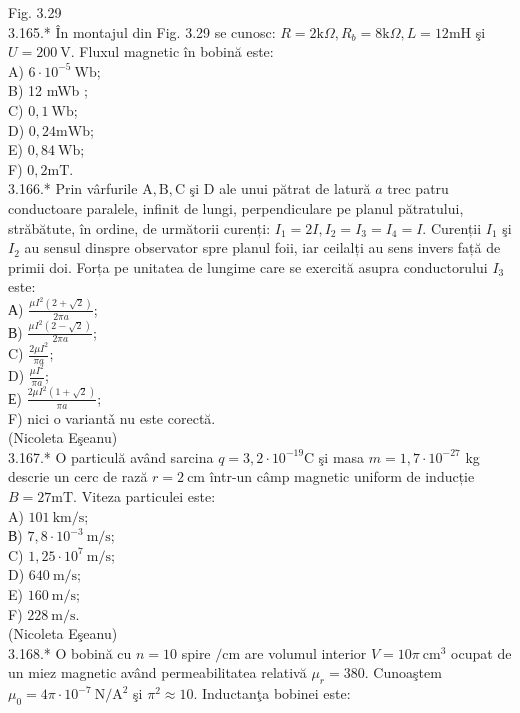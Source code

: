 \documentclass[10pt]{article}
\begin{document}
Fig. 3.29\\
3.165.* În montajul din Fig. 3.29 se cunosc: $R=2 \mathrm{k} \Omega, R_{b}=8 \mathrm{k} \Omega, L=12 \mathrm{mH}$ şi $U=200 \mathrm{~V}$. Fluxul magnetic în bobină este:\\
A) $6 \cdot 10^{-5} \mathrm{~Wb}$;\\
B) 12 mWb ;\\
C) $0,1 \mathrm{~Wb}$;\\
D) $0,24 \mathrm{mWb}$;\\
E) $0,84 \mathrm{~Wb}$;\\
F) $0,2 \mathrm{mT}$.\\
3.166.* Prin vârfurile $\mathrm{A}, \mathrm{B}, \mathrm{C}$ şi D ale unui pătrat de latură $a$ trec patru conductoare paralele, infinit de lungi, perpendiculare pe planul pătratului, străbătute, în ordine, de următorii curenți: $I_{1}=2 I, I_{2}=I_{3}=I_{4}=I$. Curenții $I_{1}$ şi $I_{2}$ au sensul dinspre observator spre planul foii, iar ceilalți au sens invers față de primii doi. Forța pe unitatea de lungime care se exercită asupra conductorului $I_{3}$ este:\\
А) $\frac{\mu I^{2}(2+\sqrt{2})}{2 \pi a}$;\\
В) $\frac{\mu I^{2}(2-\sqrt{2})}{2 \pi a}$;\\
C) $\frac{2 \mu I^{2}}{\pi a}$;\\
D) $\frac{\mu I^{2}}{\pi a}$;\\
Е) $\frac{2 \mu I^{2}(1+\sqrt{2})}{\pi a}$;\\
F) nici o variantǎ nu este corectă.\\
(Nicoleta Eşeanu)\\
3.167.* O particulă având sarcina $q=3,2 \cdot 10^{-19} \mathrm{C}$ şi masa $m=1,7 \cdot 10^{-27}$ kg descrie un cerc de rază $r=2 \mathrm{~cm}$ într-un câmp magnetic uniform de inducție $B=27 \mathrm{mT}$. Viteza particulei este:\\
A) $101 \mathrm{~km} / \mathrm{s}$;\\
В) $7,8 \cdot 10^{-3} \mathrm{~m} / \mathrm{s}$;\\
C) $1,25 \cdot 10^{7} \mathrm{~m} / \mathrm{s}$;\\
D) $640 \mathrm{~m} / \mathrm{s}$;\\
E) $160 \mathrm{~m} / \mathrm{s}$;\\
F) $228 \mathrm{~m} / \mathrm{s}$.\\
(Nicoleta Eşeanu)\\
3.168.* O bobină cu $n=10$ spire $/ \mathrm{cm}$ are volumul interior $V=10 \pi \mathrm{~cm}^{3}$ ocupat de un miez magnetic având permeabilitatea relativă $\mu_{r}=380$. Cunoaştem $\mu_{0}=4 \pi \cdot 10^{-7} \mathrm{~N} / \mathrm{A}^{2}$ şi $\pi^{2} \approx 10$. Inductanţa bobinei este:\\
\end{document}

